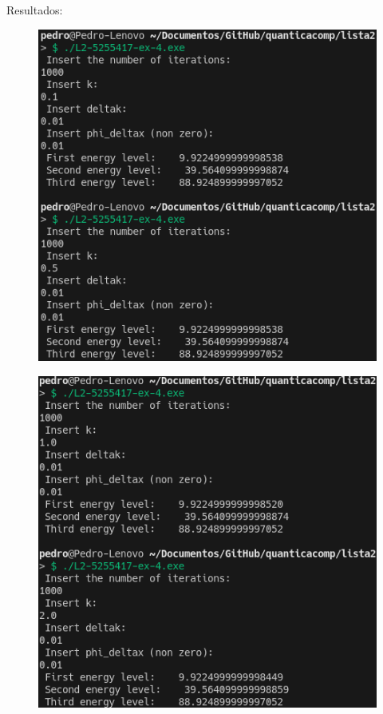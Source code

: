 \documentclass[12pt, a4paper]{article} %
\begin{document}
        Resultados:
        \begin{figure}[H]    
            \centering
            \includegraphics[scale=0.5]{../images/results-ex4-1.png}
            \caption{}
        \end{figure}
        \begin{figure}[H]    
            \centering
            \includegraphics[scale=0.5]{../images/results-ex4-2.png}
            \caption{}
        \end{figure}
\end{document}
